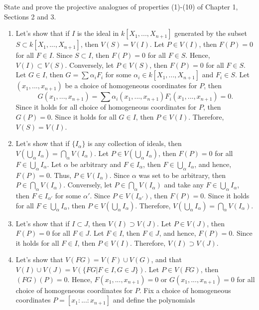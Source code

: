 \begin{exercise}
    State and prove the projective analogues of properties (1)-(10) of Chapter 1, Sections 2 and 3. \\
\end{exercise}

\begin{solution}
    \begin{enumerate}[label = (\arabic*)]
        \item Let's show that if $I$ is the ideal in $k[X_1, ..., X_{n+1}]$ generated by the subset $S \subset k[X_1, ..., X_{n+1}]$, then $V(S) = V(I)$. Let $P \in V(I)$, then $F(P) = 0$ for all $F \in I$. Since $S \subset I$, then $F(P) = 0$ for all $F \in S$. Hence, $V(I) \subset V(S)$. Conversely, let $P \in V(S)$, then $F(P) = 0$ for all $F \in S$. Let $G \in I$, then $G = \sum \alpha_i F_i$ for some $\alpha_i \in k[X_1, ..., X_{n+1}]$ and $F_i \in S$. Let $(x_1, ..., x_{n+1})$ be a choice of homogeneous coordinates for $P$, then
        $$G(x_1, ..., x_{n+1}) = \sum \alpha_i(x_1, ..., x_{n+1}) F_i(x_1, ..., x_{n+1}) = 0.$$
        Since it holds for all choice of homogeneous coordinates for $P$, then $G(P) = 0$. Since it holds for all $G \in I$, then $P \in V(I)$. Therefore, $V(S) = V(I)$.
        \item Let's show that if $\{I_{\alpha}\}$ is any collection of ideals, then $V(\bigcup_{\alpha}I_{\alpha}) = \bigcap_{\alpha}V(I_{\alpha})$. Let $P \in V(\bigcup_{\alpha}I_{\alpha})$, then $F(P) = 0$ for all $F \in \bigcup_{\alpha}I_{\alpha}$. Let $\alpha$ be arbitrary and $F \in I_{\alpha}$, then $F \in \bigcup_{\alpha}I_{\alpha}$, and hence, $F(P) = 0$. Thus, $P \in V(I_{\alpha})$. Since $\alpha$ was set to be arbitrary, then $P \in \bigcap_{\alpha}V(I_{\alpha})$. Conversely, let $P \in \bigcap_{\alpha}V(I_{\alpha})$ and take any $F \in \bigcup_{\alpha}I_{\alpha}$, then $F \in I_{\alpha'}$ for some $\alpha'$. Since $P \in V(I_{\alpha'})$, then $F(P) = 0$. Since it holds for all $F \in \bigcup_{\alpha}I_{\alpha}$, then $P \in V(\bigcup_{\alpha}I_{\alpha})$. Therefore, $V(\bigcup_{\alpha}I_{\alpha}) = \bigcap_{\alpha}V(I_{\alpha})$.
        \item Let's show that if $I \subset J$, then $V(I) \supset V(J)$. Let $P \in V(J)$, then $F(P) = 0$ for all $F \in J$. Let $F \in I$, then $F \in J$, and hence, $F(P) = 0$. Since it holds for all $F \in I$, then $P \in V(I)$. Therefore, $V(I) \supset V(J)$.
        \item Let's show that $V(FG) = V(F)\cup V(G)$, and that $V(I) \cup V(J) = V(\{FG | F\in I, G \in J\})$. Let $P \in V(FG)$, then $(FG)(P) = 0$. Hence, $F(x_1, ..., x_{n+1}) = 0$ or $G(x_1, ..., x_{n+1}) = 0$ for all choice of homogeneous coordinates for $P$. Fix a choice of homogeneous coordinates $P = [x_1 : ... : x_{n+1}]$ and define the polynomials

\end{enumerate}
\end{solution}
